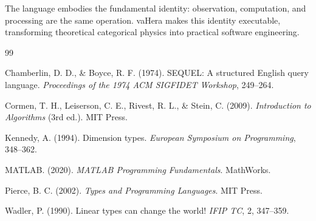 \documentclass[twocolumn,10pt]{article}
\theoremstyle{definition}
\theoremstyle{remark}
\begin{document}
The language embodies the fundamental identity: observation, computation, and processing are the same operation. vaHera makes this identity executable, transforming theoretical categorical physics into practical software engineering.


\begin{thebibliography}{99}

Chamberlin, D. D., \& Boyce, R. F. (1974). SEQUEL: A structured English query language. \textit{Proceedings of the 1974 ACM SIGFIDET Workshop}, 249--264.

Cormen, T. H., Leiserson, C. E., Rivest, R. L., \& Stein, C. (2009). \textit{Introduction to Algorithms} (3rd ed.). MIT Press.

Kennedy, A. (1994). Dimension types. \textit{European Symposium on Programming}, 348--362.

MATLAB. (2020). \textit{MATLAB Programming Fundamentals}. MathWorks.

Pierce, B. C. (2002). \textit{Types and Programming Languages}. MIT Press.

Wadler, P. (1990). Linear types can change the world! \textit{IFIP TC}, 2, 347--359.

\end{thebibliography}
\end{document}
